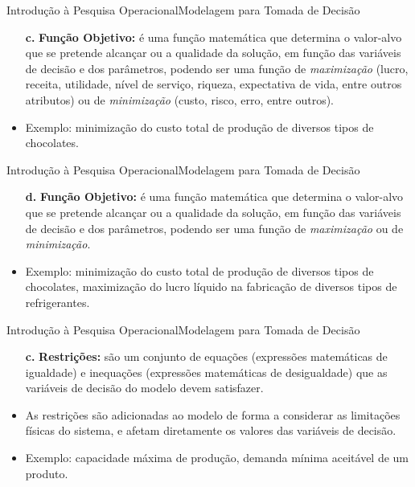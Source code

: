 \documentclass[t]{beamer}
\begin{document}
\begin{ftst}{Introdução à Pesquisa Operacional}{Modelagem para Tomada de Decisão}
\small
\begin{itemize}
    \item[\textbf{c.}] \textbf{Função Objetivo:} é uma função matemática que determina o valor-alvo que se pretende alcançar ou a qualidade da solução, em função das variáveis de decisão e dos parâmetros, podendo ser uma função de \textit{maximização} (lucro, receita, utilidade, nível de serviço, riqueza, expectativa de vida, entre outros atributos) ou de \textit{minimização} (custo, risco, erro, entre outros).
    \vone
    \item Exemplo: minimização do custo total de produção de diversos tipos de chocolates.
\end{itemize}

\end{ftst}


\begin{ftst}{Introdução à Pesquisa Operacional}{Modelagem para Tomada de Decisão}

\begin{itemize}
    \item[\textbf{d.}] \textbf{Função Objetivo:} é uma função matemática que determina o valor-alvo que se pretende alcançar ou a qualidade da solução, em função das variáveis de decisão e dos parâmetros, podendo ser uma função de \textit{maximização} ou de \textit{minimização}.
    \vone
    \item Exemplo: minimização do custo total de produção de diversos tipos de chocolates, maximização do lucro líquido na fabricação de diversos tipos de refrigerantes.
\end{itemize}

\end{ftst}


\begin{ftst}{Introdução à Pesquisa Operacional}{Modelagem para Tomada de Decisão}

\begin{itemize}
    \item[\textbf{c.}] \textbf{Restrições:} são um conjunto de equações (expressões matemáticas de igualdade) e inequações (expressões matemáticas de desigualdade) que as variáveis de decisão do modelo devem satisfazer. 
    \vone
    \item As restrições são adicionadas ao modelo de forma a considerar as limitações físicas do sistema, e afetam diretamente os valores das variáveis de decisão. 
    \vone
    \item Exemplo: capacidade máxima de produção, demanda mínima aceitável de um produto.
\end{itemize}

\end{ftst}
\end{document}
